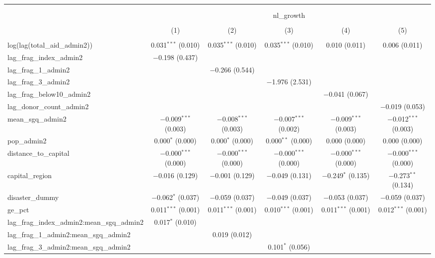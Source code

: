 
\begin{table}[!htbp] \centering 
  \caption{} 
  \label{} 
\begin{tabular}{@{\extracolsep{2pt}}lccccc} 
\\[-1.8ex]\hline 
\hline \\[-1.8ex] 
\\[-1.8ex] & \multicolumn{5}{c}{nl\_growth} \\ 
\\[-1.8ex] & (1) & (2) & (3) & (4) & (5)\\ 
\hline \\[-1.8ex] 
 log(lag(total\_aid\_admin2)) & 0.031$^{***}$ (0.010) & 0.035$^{***}$ (0.010) & 0.035$^{***}$ (0.010) & 0.010 (0.011) & 0.006 (0.011) \\ 
  lag\_frag\_index\_admin2 & $-$0.198 (0.437) &  &  &  &  \\ 
  lag\_frag\_1\_admin2 &  & $-$0.266 (0.544) &  &  &  \\ 
  lag\_frag\_3\_admin2 &  &  & $-$1.976 (2.531) &  &  \\ 
  lag\_frag\_below10\_admin2 &  &  &  & $-$0.041 (0.067) &  \\ 
  lag\_donor\_count\_admin2 &  &  &  &  & $-$0.019 (0.053) \\ 
  mean\_sgq\_admin2 & $-$0.009$^{***}$ (0.003) & $-$0.008$^{***}$ (0.003) & $-$0.007$^{***}$ (0.002) & $-$0.009$^{***}$ (0.003) & $-$0.012$^{***}$ (0.003) \\ 
  pop\_admin2 & 0.000$^{*}$ (0.000) & 0.000$^{*}$ (0.000) & 0.000$^{**}$ (0.000) & 0.000 (0.000) & 0.000 (0.000) \\ 
  distance\_to\_capital & $-$0.000$^{***}$ (0.000) & $-$0.000$^{***}$ (0.000) & $-$0.000$^{***}$ (0.000) & $-$0.000$^{***}$ (0.000) & $-$0.000$^{***}$ (0.000) \\ 
  capital\_region & $-$0.016 (0.129) & $-$0.001 (0.129) & $-$0.049 (0.131) & $-$0.249$^{*}$ (0.135) & $-$0.273$^{**}$ (0.134) \\ 
  disaster\_dummy & $-$0.062$^{*}$ (0.037) & $-$0.059 (0.037) & $-$0.049 (0.037) & $-$0.053 (0.037) & $-$0.059 (0.037) \\ 
  ge\_pct & 0.011$^{***}$ (0.001) & 0.011$^{***}$ (0.001) & 0.010$^{***}$ (0.001) & 0.011$^{***}$ (0.001) & 0.012$^{***}$ (0.001) \\ 
  lag\_frag\_index\_admin2:mean\_sgq\_admin2 & 0.017$^{*}$ (0.010) &  &  &  &  \\ 
  lag\_frag\_1\_admin2:mean\_sgq\_admin2 &  & 0.019 (0.012) &  &  &  \\ 
  lag\_frag\_3\_admin2:mean\_sgq\_admin2 &  &  & 0.101$^{*}$ (0.056) &  &  \\ 

\end{tabular}
\end{table}

